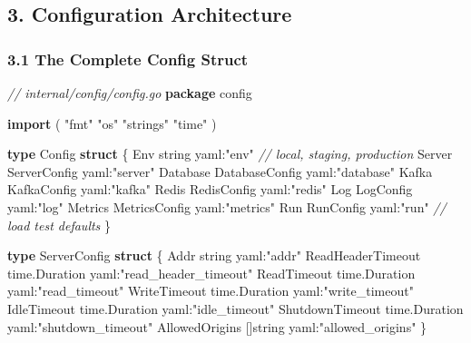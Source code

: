 \documentclass[
]{article}
\newenvironment{Shaded}{}{}
\newcommand{\CommentTok}[1]{\textcolor[rgb]{0.38,0.63,0.69}{\textit{#1}}}
\newcommand{\DataTypeTok}[1]{\textcolor[rgb]{0.56,0.13,0.00}{#1}}
\newcommand{\KeywordTok}[1]{\textcolor[rgb]{0.00,0.44,0.13}{\textbf{#1}}}
\newcommand{\NormalTok}[1]{#1}
\newcommand{\OperatorTok}[1]{\textcolor[rgb]{0.40,0.40,0.40}{#1}}
\newcommand{\StringTok}[1]{\textcolor[rgb]{0.25,0.44,0.63}{#1}}
\begin{document}
\hypertarget{configuration-architecture}{%
\subsection{3. Configuration
Architecture}\label{configuration-architecture}}

\hypertarget{the-complete-config-struct}{%
\subsubsection{3.1 The Complete Config
Struct}\label{the-complete-config-struct}}

\begin{Shaded}
\begin{Highlighting}[]
\CommentTok{// internal/config/config.go}
\KeywordTok{package}\NormalTok{ config}

\KeywordTok{import} \OperatorTok{(}
    \StringTok{"fmt"}
    \StringTok{"os"}
    \StringTok{"strings"}
    \StringTok{"time"}
\OperatorTok{)}

\KeywordTok{type}\NormalTok{ Config }\KeywordTok{struct} \OperatorTok{\{}
\NormalTok{    Env      }\DataTypeTok{string}         \StringTok{\textasciigrave{}yaml:"env"\textasciigrave{}}      \CommentTok{// local, staging, production}
\NormalTok{    Server   ServerConfig   }\StringTok{\textasciigrave{}yaml:"server"\textasciigrave{}}
\NormalTok{    Database DatabaseConfig }\StringTok{\textasciigrave{}yaml:"database"\textasciigrave{}}
\NormalTok{    Kafka    KafkaConfig    }\StringTok{\textasciigrave{}yaml:"kafka"\textasciigrave{}}
\NormalTok{    Redis    RedisConfig    }\StringTok{\textasciigrave{}yaml:"redis"\textasciigrave{}}
\NormalTok{    Log      LogConfig      }\StringTok{\textasciigrave{}yaml:"log"\textasciigrave{}}
\NormalTok{    Metrics  MetricsConfig  }\StringTok{\textasciigrave{}yaml:"metrics"\textasciigrave{}}
\NormalTok{    Run      RunConfig      }\StringTok{\textasciigrave{}yaml:"run"\textasciigrave{}}      \CommentTok{// load test defaults}
\OperatorTok{\}}

\KeywordTok{type}\NormalTok{ ServerConfig }\KeywordTok{struct} \OperatorTok{\{}
\NormalTok{    Addr              }\DataTypeTok{string}        \StringTok{\textasciigrave{}yaml:"addr"\textasciigrave{}}
\NormalTok{    ReadHeaderTimeout time}\OperatorTok{.}\NormalTok{Duration }\StringTok{\textasciigrave{}yaml:"read\_header\_timeout"\textasciigrave{}}
\NormalTok{    ReadTimeout       time}\OperatorTok{.}\NormalTok{Duration }\StringTok{\textasciigrave{}yaml:"read\_timeout"\textasciigrave{}}
\NormalTok{    WriteTimeout      time}\OperatorTok{.}\NormalTok{Duration }\StringTok{\textasciigrave{}yaml:"write\_timeout"\textasciigrave{}}
\NormalTok{    IdleTimeout       time}\OperatorTok{.}\NormalTok{Duration }\StringTok{\textasciigrave{}yaml:"idle\_timeout"\textasciigrave{}}
\NormalTok{    ShutdownTimeout   time}\OperatorTok{.}\NormalTok{Duration }\StringTok{\textasciigrave{}yaml:"shutdown\_timeout"\textasciigrave{}}
\NormalTok{    AllowedOrigins    }\OperatorTok{[]}\DataTypeTok{string}      \StringTok{\textasciigrave{}yaml:"allowed\_origins"\textasciigrave{}}
\OperatorTok{\}}


\end{Highlighting}
\end{Shaded}
\end{document}
